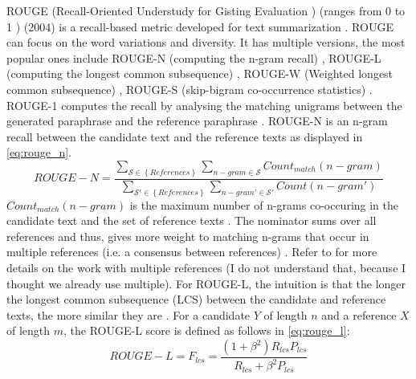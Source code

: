 ROUGE (Recall-Oriented Understudy for Gisting Evaluation \citep{palivela_optimization_2021,lin_rouge_2004}) 
(ranges from 0 to 1 \citep{kurt_pehlivanoglu_comparative_2024}) (2004) 
is a recall-based metric developed for text summarization \citep{zhou_paraphrase_2021,palivela_optimization_2021,kurt_pehlivanoglu_comparative_2024,lin_rouge_2004}.
ROUGE can focus on the word variations and diversity.
It has multiple versions, the most popular ones include 
ROUGE-N (computing the n-gram recall) \citep{zhou_paraphrase_2021,palivela_optimization_2021,kurt_pehlivanoglu_comparative_2024}, 
ROUGE-L (computing the longest common subsequence) \citep{zhou_paraphrase_2021,palivela_optimization_2021,kurt_pehlivanoglu_comparative_2024}, 
ROUGE-W (Weighted longest common subsequence) \citep{palivela_optimization_2021}, 
ROUGE-S (skip-bigram co-occurrence statistics) \citep{palivela_optimization_2021}.
ROUGE-1 computes the recall by analysing the matching unigrams between the generated paraphrase and the reference paraphrase \citep{palivela_optimization_2021,kurt_pehlivanoglu_comparative_2024}.
ROUGE-N is an n-gram recall between the candidate text and the reference texts \citep{lin_rouge_2004} as displayed in \autoref{eq:rouge_n}.
\begin{equation}
    ROUGE-N = \frac{\sum_{\mathcal{S} \in \left\{ References \right\}}\sum_{n-gram \in\mathcal{S}}Count_{match}(n-gram)}{\sum_{\mathcal{S'} \in \left\{ References \right\}}\sum_{n-gram' \in\mathcal{S'}}Count(n-gram')}
\label{eq:rouge_n}
\end{equation}
$Count_{match}(n-gram)$ is the maximum number of n-grams co-occuring in the candidate text and the set of reference texts \citep{lin_rouge_2004}.
The nominator sums over all references and thus, gives more weight to matching n-grams that occur in multiple references (i.e. a consensus between references) \citep{lin_rouge_2004}.
Refer to \citet{lin_rouge_2004} for more details on the work with multiple references (I do not understand that, because I thought we already use multiple).
For ROUGE-L, the intuition is that the longer the longest common subsequence (LCS) between the candidate and reference texts, the more similar they are \citep{lin_rouge_2004}.
For a candidate $Y$ of length $n$ and a reference $X$ of length $m$, the ROUGE-L score is defined as follows in \autoref{eq:rouge_l}:
\begin{equation}
    ROUGE-L = F_{lcs} = \frac{(1 + \beta^2)R_{lcs}P_{lcs}}{R_{lcs} + \beta^2 P_{lcs}}
\label{eq:rouge_l}
\end{equation}
